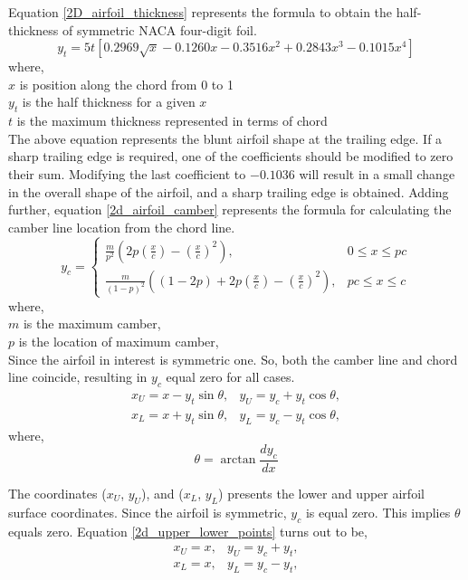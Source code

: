 Equation \ref{2D_airfoil_thickness} represents the formula to obtain the half-thickness of symmetric NACA four-digit foil.
\begin{equation}
y_{t}=5 t\left[0.2969 \sqrt{x}-0.1260 x-0.3516 x^{2}+0.2843 x^{3}-0.1015 x^{4}\right]
\label{2D_airfoil_thickness}
\end{equation}
where,\\
$x$ is position along the chord from 0 to 1\\
$y_t$ is the half thickness for a given $x$\\
$t$ is the maximum thickness represented in terms of chord\\

The above equation represents the blunt airfoil shape at the trailing edge. If a sharp trailing edge is required, one of the coefficients should be modified to zero their sum. Modifying the last coefficient to $-0.1036$ will result in a small change in the overall shape of the airfoil, and a sharp trailing edge is obtained. Adding further, equation \ref{2d_airfoil_camber} represents the formula for calculating the camber line location from the chord line.
\begin{equation}
y_{c}=\left\{\begin{array}{ll}
\frac{m}{p^{2}}\left(2 p\left(\frac{x}{c}\right)-\left(\frac{x}{c}\right)^{2}\right), & 0 \leq x \leq p c \\
\frac{m}{(1-p)^{2}}\left((1-2 p)+2 p\left(\frac{x}{c}\right)-\left(\frac{x}{c}\right)^{2}\right), & p c \leq x \leq c
\end{array}\right.
\label{2d_airfoil_camber}
\end{equation}
where,\\
$m$ is the maximum camber, \\
$p$ is the location of maximum camber, \\

Since the airfoil in interest is symmetric one. So, both the camber line and chord line coincide, resulting in $y_c$ equal zero for all cases.
\begin{equation}
\begin{array}{ll}
x_{U}=x-y_{t} \sin \theta, & y_{U}=y_{c}+y_{t} \cos \theta, \\
x_{L}=x+y_{t} \sin \theta, & y_{L}=y_{c}-y_{t} \cos \theta,
\end{array}
\label{2d_upper_lower_points}
\end{equation}
where,
\begin{equation}
\theta=\arctan \frac{d y_{c}}{d x}
\end{equation}

The coordinates ($x_U$, $y_U$), and ($x_L$, $y_L$) presents the lower and upper airfoil surface coordinates. Since the airfoil is symmetric, $y_c$ is equal zero. This implies $\theta$ equals zero. Equation \ref{2d_upper_lower_points} turns out to be,
\begin{equation}
\begin{array}{ll}
x_{U}=x, & y_{U}=y_{c}+y_{t}, \\
x_{L}=x, & y_{L}=y_{c}-y_{t},
\end{array}
\label{2d_final_points}
\end{equation}

